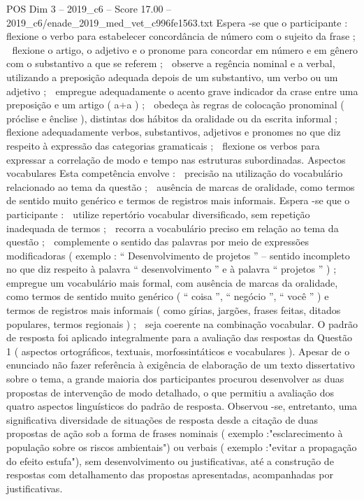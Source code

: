 \begin{textsample}{POS Dim 3 – 2019\_c6 – Score 17.00 – 2019\_c6/enade\_2019\_med\_vet\_c996fe1563.txt}
Espera -se que o participante :  flexione o verbo para estabelecer concordância de número com o sujeito da frase ;  flexione o artigo, o adjetivo e o pronome para concordar em número e em gênero com o substantivo a que se referem ;  observe a regência nominal e a verbal, utilizando a preposição adequada depois de um substantivo, um verbo ou um adjetivo ;  empregue adequadamente o acento grave indicador da crase entre uma preposição e um artigo ( a+a ) ;  obedeça às regras de colocação pronominal ( próclise e ênclise ), distintas dos hábitos da oralidade ou da escrita informal ;  flexione adequadamente verbos, substantivos, adjetivos e pronomes no que diz respeito à expressão das categorias gramaticais ;  flexione os verbos para expressar a correlação de modo e tempo nas estruturas subordinadas.
Aspectos vocabulares Esta competência envolve :  precisão na utilização do vocabulário relacionado ao tema da questão ;  ausência de marcas de oralidade, como termos de sentido muito genérico e termos de registros mais informais.
Espera -se que o participante :  utilize repertório vocabular diversificado, sem repetição inadequada de termos ;  recorra a vocabulário preciso em relação ao tema da questão ;  complemente o sentido das palavras por meio de expressões modificadoras ( exemplo : “ Desenvolvimento de projetos ” – sentido incompleto no que diz respeito à palavra “ desenvolvimento ” e à palavra “ projetos ” ) ;  empregue um vocabulário mais formal, com ausência de marcas da oralidade, como termos de sentido muito genérico ( “ coisa ”, “ negócio ”, “ você ” ) e termos de registros mais informais ( como gírias, jargões, frases feitas, ditados populares, termos regionais ) ;  seja coerente na combinação vocabular.
O padrão de resposta foi aplicado integralmente para a avaliação das respostas da Questão 1 ( aspectos ortográficos, textuais, morfossintáticos e vocabulares ).
Apesar de o enunciado não fazer referência à exigência de elaboração de um texto dissertativo sobre o tema, a grande maioria dos participantes procurou desenvolver as duas propostas de intervenção de modo detalhado, o que permitiu a avaliação dos quatro aspectos linguísticos do padrão de resposta.
Observou -se, entretanto, uma significativa diversidade de situações de resposta desde a citação de duas propostas de ação sob a forma de frases nominais ( exemplo :"esclarecimento à população sobre os riscos ambientais") ou verbais ( exemplo :"evitar a propagação do efeito estufa"), sem desenvolvimento ou justificativas, até a construção de respostas com detalhamento das propostas apresentadas, acompanhadas por justificativas.

\end{textsample}
